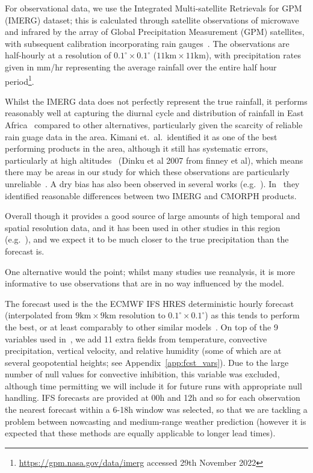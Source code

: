 \documentclass[../main.tex]{subfiles}
\begin{document}
For observational data, we use the Integrated Multi-satellite Retrievals for GPM (IMERG) dataset; this is calculated through satellite observations of microwave and infrared by the array of Global Precipitation Measurement (GPM) satellites, with subsequent calibration incorporating rain gauges~\citep{huffman_nasa_2018}.
The observations are half-hourly at a resolution of $0.1^{\circ} \times 0.1^{\circ}$ ($11\text{km} \times 11\text{km}$), with precipitation rates given in mm/hr representing the average rainfall over the entire half hour period\footnote{\href{https://gpm.nasa.gov/data/imerg}{https://gpm.nasa.gov/data/imerg} accessed 29th November 2022}. 

Whilst the IMERG data does not perfectly represent the true rainfall, it performs reasonably well at capturing the diurnal cycle and distribution of rainfall in East Africa~\citep{dezfuli_validation_2017, roca_comparing_2010, camberlin_major_2018} compared to other alternatives, particularly given the scarcity of reliable rain guage data in the area. Kimani et.~al.~identified it as one of the best performing products in the area, although it still has systematic errors, particularly at high altitudes~\citep{} (Dinku et al 2007 from finney et al), which means there may be areas in our study for which these observations are particularly unreliable~\citep{kimani_assessment_2017}. A dry bias has also been observed in several works (e.g.~\citep{vogel_skill_2018}). In~\citep{finney_implications_2019} they identified reasonable differences between two IMERG and CMORPH products.

Overall though it provides a good source of large amounts of high temporal and spatial resolution data, and it has been used in other studies in this region (e.g.~\citep{woodhams_what_2018, finney_implications_2019, cafaro_convection-permitting_2021}), and we expect it to be much closer to the true precipitation than the forecast is.

One alternative would the point; whilst many studies use reanalysis, it is more informative to use observations that are in no way influenced by the model.

The forecast used is the the ECMWF IFS HRES deterministic hourly forecast~\citep{ecmwf_operational_2023} (interpolated from $9\text{km} \times 9\text{km}$ resolution to $0.1^{\circ} \times 0.1^{\circ}$) as this tends to perform the best, or at least comparably to other similar models~\citep{haiden_intercomparison_2012}. On top of the 9 variables used in~\citep{harris_generative_2022}, we add 11 extra fields from temperature, convective precipitation, vertical velocity, and relative humidity (some of which are at several geopotential heights; see Appendix~\ref{app:fcst_vars}). Due to the large number of null values for convective inhibition, this variable was excluded, although time permitting we will include it for future runs with appropriate null handling. IFS forecasts are provided at 00h and 12h and so for each observation the nearest forecast within a 6-18h window was selected, so that we are tackling a problem between nowcasting and medium-range weather prediction (however it is expected that these methods are equally applicable to longer lead times).
\end{document}
